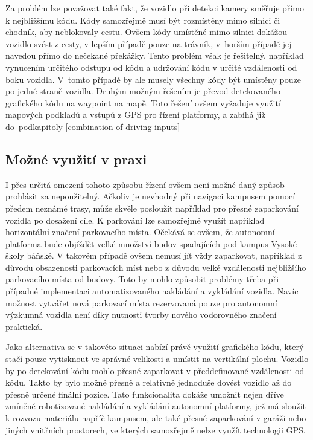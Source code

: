 \documentclass[czech, bachelor]{diploma}
\newcommand{\filipref}[1]{\ref{#1}\,--\,\nameref{#1}}
\begin{document}
Za problém lze považovat také fakt, že vozidlo při detekci kamery směřuje přímo k nejbližšímu kódu. Kódy samozřejmě musí být
rozmístěny mimo silnici či chodník, aby neblokovaly cestu. Ovšem kódy umístěné mimo silnici dokážou vozidlo svést z cesty,
v lepším případě pouze na trávník, v~horším případě jej navedou přímo do nečekané překážky. Tento problém však je řešitelný,
například vynucením určitého odstupu od kódu a udržování kódu v určité vzdálenosti od boku vozidla.  V~tomto případě by ale musely
všechny kódy být umístěny pouze po jedné straně vozidla. Druhým možným řešením je převod detekovaného grafického kódu na waypoint
na mapě. Toto řešení ovšem vyžaduje využití mapových podkladů a vstupů z GPS pro řízení platformy, a zabíhá již do~podkapitoly
\filipref{combination-of-driving-inputs}

\subsection{Možné využití v praxi}

I přes určitá omezení tohoto způsobu řízení ovšem není možné daný způsob prohlásit za nepoužitelný. Ačkoliv je nevhodný
při navigaci kampusem pomocí předem neznámé trasy, může skvěle posloužit například pro přesné zaparkování vozidla po dosažení
cíle. K parkování lze samozřejmě využít například horizontální značení parkovacího místa. Očekává se ovšem, že autonomní platforma
bude objíždět velké množství budov spadajících pod kampus Vysoké školy báňské. V takovém případě ovšem nemusí jít vždy zaparkovat,
například z důvodu obsazenosti parkovacích míst nebo z důvodu velké vzdálenosti nejbližšího parkovacího místa od budovy. Toto by
mohlo způsobit problémy třeba při případné implementaci automatizovaného nakládání a vykládání vozidla. Navíc možnost vytvářet
nová parkovací místa rezervovaná pouze pro autonomní výzkumná vozidla není díky nutnosti tvorby nového vodorovného značení
praktická.

Jako alternativa se v takovéto situaci nabízí právě využití grafického kódu, který stačí pouze vytisknout ve správné velikosti
a umístit na vertikální plochu. Vozidlo by po detekování kódu mohlo přesně zaparkovat v předdefinované vzdálenosti od kódu. Takto
by bylo možné přesně a relativně jednoduše dovést vozidlo až do přesně určené finální pozice. Tato funkcionalita dokáže umožnit
nejen dříve zmíněné robotizované nakládání a vykládání autonomní platformy, jež má sloužit k rozvozu materiálu napříč kampusem,
ale také přesné zaparkování v garáži nebo jiných vnitřních prostorech, ve kterých samozřejmě nelze využít technologii GPS.
\end{document}

